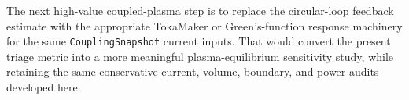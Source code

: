 \documentclass[11pt]{article}
\begin{document}
The next high-value coupled-plasma step is to replace the circular-loop feedback estimate with the appropriate TokaMaker or Green's-function response machinery for the same \texttt{CouplingSnapshot} current inputs. That would convert the present triage metric into a more meaningful plasma-equilibrium sensitivity study, while retaining the same conservative current, volume, boundary, and power audits developed here.
\end{document}
